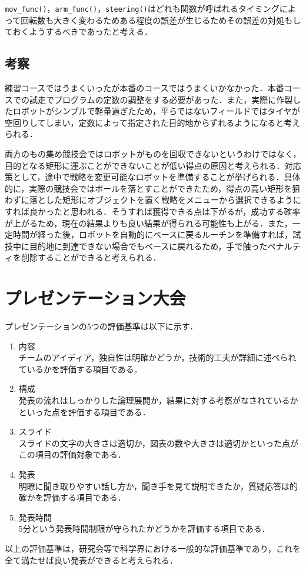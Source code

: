\begin{multicols*}{2}
\texttt{mov\_func()}，\texttt{arm\_func()}，\texttt{steering()}はどれも関数が呼ばれるタイミングによって回転数も大きく変わるためある程度の誤差が生じるためその誤差の対処もしておくようするべきであったと考える．

\subsection{考察}%
練習コースではうまくいったが本番のコースではうまくいかなかった．本番コースでの試走でプログラムの定数の調整をする必要があった．また，実際に作製したロボットがシンプルで軽量過ぎたため，平らではないフィールドではタイヤが空回りしてしまい，定数によって指定された目的地からずれるようになると考えられる．

両方のもの集め競技会ではロボットがものを回収できないというわけではなく，目的となる矩形に運ぶことができないことが低い得点の原因と考えられる．対応策として，途中で戦略を変更可能なロボットを準備することが挙げられる．具体的に，実際の競技会ではボールを落とすことができたため，得点の高い矩形を狙わずに落とした矩形にオブジェクトを置く戦略をメニューから選択できるようにすれば良かったと思われる．そうすれば獲得できる点は下がるが，成功する確率が上がるため，現在の結果よりも良い結果が得られる可能性も上がる．また，一定時間が経った後，ロボットを自動的にベースに戻るルーチンを準備すれば，試技中に目的地に到達できない場合でもベースに戻れるため，手で触ったペナルティを削除することができると考えられる．

\section{プレゼンテーション大会} %
プレゼンテーションの5つの評価基準は以下に示す．
\begin{enumerate}
\item 内容\\ チームのアイディア，独自性は明確かどうか，技術的工夫が詳細に述べられているかを評価する項目である．
\item 構成\\ 発表の流れはしっかりした論理展開か，結果に対する考察がなされているかといった点を評価する項目である．
\item スライド\\ スライドの文字の大きさは適切か，図表の数や大きさは適切かといった点がこの項目の評価対象である．
\item 発表\\ 明瞭に聞き取りやすい話し方か，聞き手を見て説明できたか，質疑応答は的確かを評価する項目である．
\item 発表時間\\ 5分という発表時間制限が守られたかどうかを評価する項目である．
\end{enumerate}
以上の評価基準は，研究会等で科学界における一般的な評価基準であり，これを全て満たせば良い発表ができると考えられる．


\end{multicols*}
